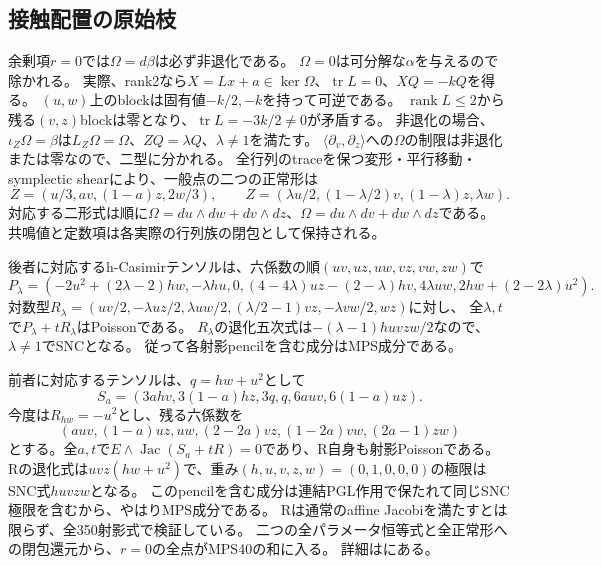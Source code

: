 \documentclass[a4paper,11pt]{ltjsarticle}
\theoremstyle{definition}
\newcommand{\rank}{\operatorname{rank}}
\begin{document}
\subsection{接触配置の原始枝}
余剰項$r=0$では$\Omega=d\beta$は必ず非退化である。
$\Omega=0$は可分解な$\alpha$を与えるので除かれる。
実際、rank2なら$X=Lx+a\in\ker\Omega$、$\operatorname{tr}L=0$、$XQ=-kQ$を得る。
$(u,w)$上のblockは固有値$-k/2,-k$を持って可逆である。
$\rank L\le2$から残る$(v,z)$blockは零となり、$\operatorname{tr}L=-3k/2\ne0$が矛盾する。
非退化の場合、$\iota_Z\Omega=\beta$は$L_Z\Omega=\Omega$、$ZQ=\lambda Q$、$\lambda\ne1$を満たす。
$\langle\partial_v,\partial_z\rangle$への$\Omega$の制限は非退化または零なので、二型に分かれる。
全行列のtraceを保つ変形・平行移動・symplectic shearにより、一般点の二つの正常形は
\[
 Z=(u/3,av,(1-a)z,2w/3),\qquad
 Z=(\lambda u/2,(1-\lambda/2)v,(1-\lambda)z,\lambda w).
\]
対応する二形式は順に$\Omega=du\wedge dw+dv\wedge dz$、$\Omega=du\wedge dv+dw\wedge dz$である。
共鳴値と定数項は各実際の行列族の閉包として保持される。

後者に対応するh-Casimirテンソルは、六係数の順$(uv,uz,uw,vz,vw,zw)$で
\[
 P_\lambda=(-2u^2+(2\lambda-2)hw,-\lambda hu,0,
 (4-4\lambda)uz-(2-\lambda)hv,4\lambda uw,2hw+(2-2\lambda)u^2).
\]
対数型$R_\lambda=(uv/2,-\lambda uz/2,\lambda uw/2,(\lambda/2-1)vz,-\lambda vw/2,wz)$に対し、
全$\lambda,t$で$P_\lambda+tR_\lambda$はPoissonである。
$R_\lambda$の退化五次式は$-(\lambda-1)huvzw/2$なので、$\lambda\ne1$でSNCとなる。
従って各射影pencilを含む成分はMPS成分である。

前者に対応するテンソルは、$q=hw+u^2$として
\[
 S_a=(3ahv,3(1-a)hz,3q,q,6auv,6(1-a)uz).
\]
今度は$R_{hw}=-u^2$とし、残る六係数を
\[
 (auv,(1-a)uz,uw,(2-2a)vz,(1-2a)vw,(2a-1)zw)
\]
とする。全$a,t$で$E\wedge\operatorname{Jac}(S_a+tR)=0$であり、R自身も射影Poissonである。
Rの退化式は$uvz(hw+u^2)$で、重み$(h,u,v,z,w)=(0,1,0,0,0)$の極限はSNC式$huvzw$となる。
このpencilを含む成分は連結PGL作用で保たれて同じSNC極限を含むから、やはりMPS成分である。
Rは通常のaffine Jacobiを満たすとは限らず、全350射影式で検証している。
二つの全パラメータ恒等式と全正常形への閉包還元から、$r=0$の全点がMPS40の和に入る。
詳細はにある。
\end{document}

